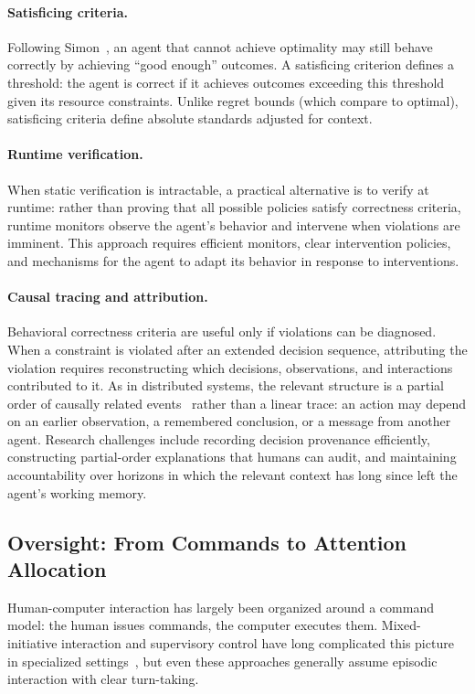 \documentclass[11pt]{article}
\begin{document}
\paragraph{Satisficing criteria.} Following Simon~\cite{simon_bounded}, an agent that cannot achieve optimality may still behave correctly by achieving ``good enough'' outcomes. A satisficing criterion defines a threshold: the agent is correct if it achieves outcomes exceeding this threshold given its resource constraints. Unlike regret bounds (which compare to optimal), satisficing criteria define absolute standards adjusted for context.

\paragraph{Runtime verification.} When static verification is intractable, a practical alternative is to verify at runtime: rather than proving that all possible policies satisfy correctness criteria, runtime monitors observe the agent's behavior and intervene when violations are imminent. This approach requires efficient monitors, clear intervention policies, and mechanisms for the agent to adapt its behavior in response to interventions.

\paragraph{Causal tracing and attribution.} Behavioral correctness criteria are useful only if violations can be diagnosed. When a constraint is violated after an extended decision sequence, attributing the violation requires reconstructing which decisions, observations, and interactions contributed to it. As in distributed systems, the relevant structure is a partial order of causally related events~\cite{lamport_time} rather than a linear trace: an action may depend on an earlier observation, a remembered conclusion, or a message from another agent. Research challenges include recording decision provenance efficiently, constructing partial-order explanations that humans can audit, and maintaining accountability over horizons in which the relevant context has long since left the agent's working memory.

\subsection{Oversight: From Commands to Attention Allocation}

Human-computer interaction has largely been organized around a command model: the human issues commands, the computer executes them. Mixed-initiative interaction and supervisory control have long complicated this picture in specialized settings~\cite{horvitz_mixed}, but even these approaches generally assume episodic interaction with clear turn-taking.
\end{document}
